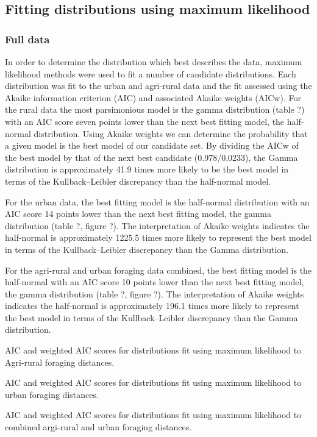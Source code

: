 \documentclass[11pt,usenames,dvipsnames]{article}
\begin{document}
\subsection{Fitting distributions using maximum likelihood}

\subsubsection{Full data}
In order to determine the distribution which best describes the data, maximum likelihood methods were used to fit a number of candidate distributions. Each distribution was fit to the urban and agri-rural data and the fit assessed using the Akaike information criterion (AIC) and associated Akaike weights (AICw). For the rural data the most parsimonious model is the gamma distribution (table ?) with an AIC score seven points lower than the next best fitting model, the half-normal distribution. Using Akaike weights we can determine the probability that a given model is the best model of our candidate set. By dividing the AICw of the best model by that of the next best candidate (0.978/0.0233), the Gamma distribution is approximately 41.9 times more likely to be the best model in terms of the Kullback–Leibler discrepancy than the half-normal model.

For the urban data, the best fitting model is the half-normal distribution with an AIC score 14 points lower than the next best fitting model, the gamma distribution (table ?, figure ?). The interpretation of Akaike weights indicates the half-normal is approximately 1225.5 times more likely to represent the best model in terms of the Kullback–Leibler discrepancy than the Gamma distribution.

For the agri-rural and urban foraging data combined, the best fitting model is the half-normal with an AIC score 10 points lower than the next best fitting model, the gamma distribution (table ?, figure ?). The interpretation of Akaike weights indicates the half-normal is approximately 196.1 times more likely to represent the best model in terms of the Kullback–Leibler discrepancy than the Gamma distribution.

\begin{table}[H]
	\centering
	\caption{AIC and weighted AIC scores for distributions fit using maximum likelihood to Agri-rural foraging distances.}
	
\end{table}
\begin{table}[H]
	\centering
	\caption{AIC and weighted AIC scores for distributions fit using maximum likelihood to urban foraging distances.}
	
\end{table}
\begin{table}[H]
	\centering
	\caption{AIC and weighted AIC scores for distributions fit using maximum likelihood to combined argi-rural and urban foraging distances.}
	
\end{table}
\end{document}
